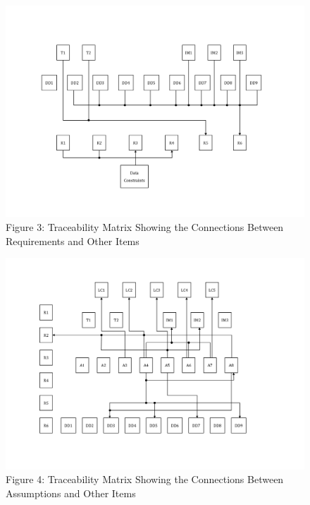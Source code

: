 \documentclass[12pt]{article}
\begin{document}
\begin{figure}
\begin{center}
\includegraphics[width=\textwidth]{../../../datafiles/GlassBR/RTrace.png}
\caption{Figure 3: Traceability Matrix Showing the Connections Between Requirements and Other Items}
\label{Figure:TraceyReqsItems}
\end{center}
\end{figure}
\begin{figure}
\begin{center}
\includegraphics[width=\textwidth]{../../../datafiles/GlassBR/ATrace.png}
\caption{Figure 4: Traceability Matrix Showing the Connections Between Assumptions and Other Items}
\label{Figure:TraceyAssumpsOthers}
\end{center}
\end{figure}
\end{document}
